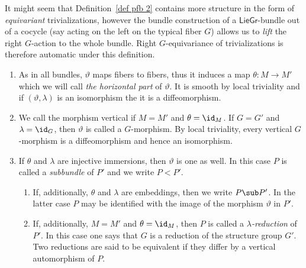 It might seem that Definition~\ref{def pfb 2} contains more structure in the form of \emph{equivariant} trivializations, however the bundle construction of a $\mathsf{LieGr}$-bundle out of a cocycle (say acting on the left on the typical fiber $G$) allows us to \emph{lift} the right $G$-action to the whole bundle. Right $G$-equivariance of trivializations is therefore automatic under this definition.

\begin{rem}\label{rem 1.1.8 RS2}
    \begin{enumerate}
        \item As in all bundles, $\vartheta$ maps fibers to fibers, thus it induces a map $\theta:M\to M'$ which we will call \emph{the horizontal part} of $\vartheta$. It is smooth by local triviality and if $(\vartheta,\lambda)$ is an isomorphism the  it is a diffeomorphism.
        \item We call the morphism vertical if $M=M'$ and $\theta=\id_M$. If $G=G'$ and $\lambda=\id_G$, then $\vartheta$ is called a $G$-morphism. By local triviality, every vertical $G$-morphism is a diffeomorphism and hence an isomorphism.
        \item If $\theta$ and $\lambda$ are injective immersions, then $\vartheta$ is one as well. In this case $P$ is called a \emph{subbundle} of $P'$ and we write $P<P'$.
        \begin{enumerate}
            \item If, additionally, $\theta$ and $\lambda$ are embeddings, then we write $P\sub P'$. In the latter case $P$ may be identified with the image of the morphism $\vartheta$ in $P'$.
            \item If, additionally, $M=M'$ and $\theta=\id_M$, then $P$ is called a \emph{$\lambda$-reduction} of $P'$. In this case one says that $G$ is a reduction of the structure group $G'$. Two reductions are said to be equivalent  if they differ by a vertical automorphism of $P$.
        \end{enumerate}
    \end{enumerate}
\end{rem}

